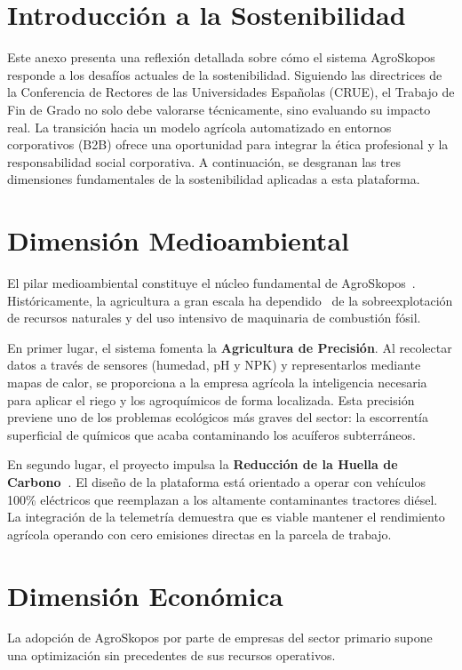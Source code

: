 
\section{Introducción a la Sostenibilidad}
Este anexo presenta una reflexión detallada sobre cómo el sistema AgroSkopos responde a los desafíos actuales de la sostenibilidad. Siguiendo las directrices de la Conferencia de Rectores de las Universidades Españolas (CRUE), el Trabajo de Fin de Grado no solo debe valorarse técnicamente, sino evaluando su impacto real. La transición hacia un modelo agrícola automatizado en entornos corporativos (B2B) ofrece una oportunidad para integrar la ética profesional y la responsabilidad social corporativa. A continuación, se desgranan las tres dimensiones fundamentales de la sostenibilidad aplicadas a esta plataforma.

\section{Dimensión Medioambiental}
El pilar medioambiental constituye el núcleo fundamental de AgroSkopos~\cite{carbonfootprint}. Históricamente, la agricultura a gran escala ha dependido~\cite{zhang2002precision} de la sobreexplotación de recursos naturales y del uso intensivo de maquinaria de combustión fósil.

En primer lugar, el sistema fomenta la \textbf{Agricultura de Precisión}. Al recolectar datos a través de sensores (humedad, pH y NPK) y representarlos mediante mapas de calor, se proporciona a la empresa agrícola la inteligencia necesaria para aplicar el riego y los agroquímicos de forma localizada. Esta precisión previene uno de los problemas ecológicos más graves del sector: la escorrentía superficial de químicos que acaba contaminando los acuíferos subterráneos.

En segundo lugar, el proyecto impulsa la \textbf{Reducción de la Huella de Carbono~\cite{carbonfootprint}}. El diseño de la plataforma está orientado a operar con vehículos 100\% eléctricos que reemplazan a los altamente contaminantes tractores diésel. La integración de la telemetría demuestra que es viable mantener el rendimiento agrícola operando con cero emisiones directas en la parcela de trabajo.

\section{Dimensión Económica}
La adopción de AgroSkopos por parte de empresas del sector primario supone una optimización sin precedentes de sus recursos operativos.

